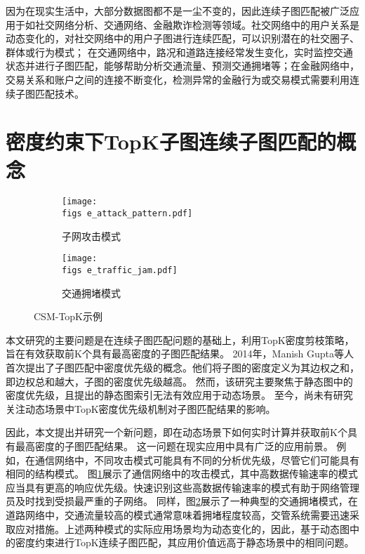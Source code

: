 因为在现实生活中，大部分数据图都不是一尘不变的，因此连续子图匹配被广泛应用于如社交网络分析、交通网络、金融欺诈检测等领域。社交网络中的用户关系是动态变化的，对社交网络中的用户子图进行连续匹配，可以识别潜在的社交圈子、群体或行为模式；
在交通网络中，路况和道路连接经常发生变化，实时监控交通状态并进行子图匹配，能够帮助分析交通流量、预测交通拥堵等；在金融网络中，交易关系和账户之间的连接不断变化，检测异常的金融行为或交易模式需要利用连续子图匹配技术。


\section{密度约束下TopK子图连续子图匹配的概念}
\begin{figure}[h!]
    \def\wscorevone{0.49}
    \centering
        \begin{subfigure}[t]{\wscorevone\linewidth}
            \centering
            \resizebox{\linewidth}{!}
            {
                \texttt{[image: \\figs e\_attack\_pattern.pdf]}
            }
            \caption{子网攻击模式~\cite{static-topk-Gupta-DBLP:conf/icde/GuptaGYCH14}}
            \label{fig:example_attack_pattern}
        \end{subfigure}
        \hfill
        \begin{subfigure}[t]{\wscorevone\linewidth}
            \centering
            \resizebox{\linewidth}{!}
            {
                \texttt{[image: \\figs e\_traffic\_jam.pdf]}
            }
            \caption{交通拥堵模式~\cite{traffic-graph-matching-DBLP:journals/pvldb/SongGCW14}}
            \label{fig:example_traffic_jam}
        \end{subfigure}
        \label{fig:definition}
        \caption{CSM-TopK示例}
    \end{figure}
本文研究的主要问题是在连续子图匹配问题的基础上，利用TopK密度剪枝策略，旨在有效获取前K个具有最高密度的子图匹配结果。
2014年，Manish Gupta等人首次提出了子图匹配中密度优先级的概念\cite{static-topk-Gupta-DBLP:conf/icde/GuptaGYCH14}。他们将子图的密度定义为其边权之和，即边权总和越大，子图的密度优先级越高。
然而，该研究主要聚焦于静态图中的密度优先级，且提出的静态图索引无法有效应用于动态场景。
至今，尚未有研究关注动态场景中TopK密度优先级机制对子图匹配结果的影响。

因此，本文提出并研究一个新问题，即在动态场景下如何实时计算并获取前K个具有最高密度的子图匹配结果。
这一问题在现实应用中具有广泛的应用前景。
例如，在通信网络中，不同攻击模式可能具有不同的分析优先级，尽管它们可能具有相同的结构模式。
图\ref{fig:example_attack_pattern}展示了通信网络中的攻击模式\cite{static-topk-Gupta-DBLP:conf/icde/GuptaGYCH14}，其中高数据传输速率的模式应当具有更高的响应优先级。快速识别这些高数据传输速率的模式有助于网络管理员及时找到受损最严重的子网络。
同样，图\ref{fig:example_traffic_jam}展示了一种典型的交通拥堵模式\cite{traffic-graph-matching-DBLP:journals/pvldb/SongGCW14}，在道路网络中，交通流量较高的模式通常意味着拥堵程度较高，交管系统需要迅速采取应对措施。上述两种模式的实际应用场景均为动态变化的，因此，基于动态图中的密度约束进行TopK连续子图匹配，其应用价值远高于静态场景中的相同问题。

